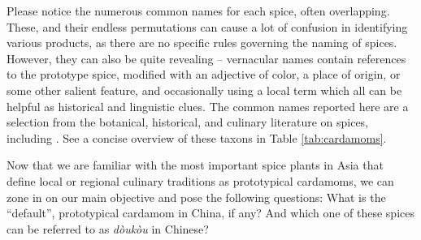 \documentclass[12pt]{article}
\begin{document}
Please notice the numerous common names for each spice, often overlapping. These, and their endless permutations can cause a lot of confusion in identifying various products, as there are no specific rules governing the naming of spices. However, they can also be quite revealing -- vernacular names contain references to the prototype spice, modified with an adjective of color, a place of origin, or some other salient feature, and occasionally using a local term which all can be helpful as historical and linguistic clues. The common names reported here are a selection from the botanical, historical, and culinary literature on spices, including \textcites{vanwyk_2014_culinary,hill_2004_contemporary,dalby_2000_dangerous,hu_2005_food,burkill_1966_dictionary,anderson_2023_history}. See a concise overview of these taxons in Table \ref{tab:cardamoms}.






Now that we are familiar with the most important spice plants in Asia that define local or regional culinary traditions as prototypical cardamoms, we can zone in on our main objective and pose the following questions: What is the ``default'', prototypical cardamom in China, if any? And which one of these spices can be referred to as \textit{dòukòu} in Chinese?
\end{document}
